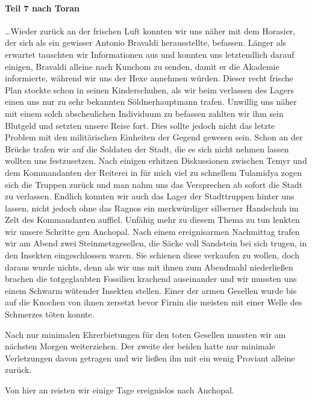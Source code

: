 \paragraph{Teil 7 nach Toran}

\dots Wieder zurück an der frischen Luft konnten wir uns näher mit dem Horasier, der sich als ein gewisser Antonio Bravaldi herausstellte, befassen. Länger als erwartet tauschten wir Informationen aus und konnten uns letztendlich darauf einigen, Bravaldi alleine nach Kunchom zu senden, damit er die Akademie informierte, während wir uns der Hexe annehmen würden. Dieser recht frische Plan stockte schon in seinen Kinderschuhen, als wir beim verlassen des Lagers einen uns nur zu sehr bekannten Söldnerhauptmann trafen. Unwillig uns näher mit einem solch abscheulichen Individuum zu befassen zahlten wir ihm sein Blutgeld und setzten unsere Reise fort. Dies sollte jedoch nicht das letzte Problem mit den militärischen Einheiten der Gegend gewesen sein. Schon an der Brücke trafen wir auf die Soldaten der Stadt, die es sich nicht nehmen lassen wollten uns festzusetzen. Nach einigen erhitzen Diskussionen zwischen Temyr und dem Kommandanten der Reiterei in für mich viel zu schnellem Tulamidya zogen sich die Truppen zurück und man nahm uns das Versprechen ab sofort die Stadt zu verlassen. Endlich konnten wir auch das Lager der Stadttruppen hinter uns lassen, nicht jedoch ohne das Ragnos ein merkwürdiger silberner Handschuh im Zelt des Kommandanten auffiel. Unfähig mehr zu diesem Thema zu tun lenkten wir unsere Schritte gen Anchopal. Nach einem ereignisarmen Nachmittag trafen wir am Abend zwei Steinmetzgesellen, die Säcke voll Sandstein bei sich trugen, in den Insekten eingeschlossen waren. Sie schienen diese verkaufen zu wollen, doch daraus wurde nichts, denn als wir uns mit ihnen zum Abendmahl niederließen brachen die totgeglaubten Fossilien krachend auseinander und wir mussten uns einem Schwarm wütender Insekten stellen. Einer der armen Gesellen wurde bis auf die Knochen von ihnen zersetzt bevor Firnin die meisten mit einer Welle des Schmerzes töten konnte.

Nach nur minimalen Ehrerbietungen für den toten Gesellen mussten wir am nächsten Morgen weiterziehen. Der zweite der beiden hatte nur minimale Verletzungen davon getragen und wir ließen ihn mit ein wenig Proviant alleine zurück.

Von hier an reisten wir einige Tage ereignislos nach Anchopal.

